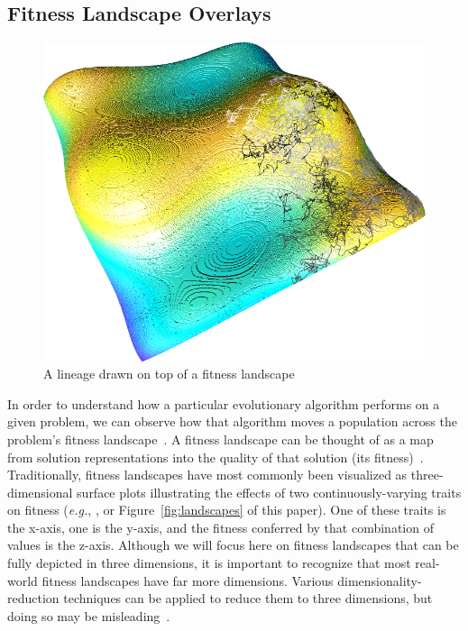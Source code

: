 \documentclass[letterpaper]{article}
\begin{document}

\subsection{Fitness Landscape Overlays}

\begin{figure}
    \centering
    \includegraphics{figs/colored.png}
    \caption{\small A lineage drawn on top of a fitness landscape}
    \label{fig:linoverlay}
\end{figure}

In order to understand how a particular evolutionary algorithm performs on a given problem, we can observe how that algorithm moves a population across the problem's fitness landscape~\citep{kauffman_towards_1987}. A fitness landscape can be thought of as a map from solution representations into the quality of that solution (its fitness)~\citep{wright_roles_1932}.  Traditionally, fitness landscapes have most commonly been visualized as three-dimensional surface plots illustrating the effects of two continuously-varying traits on fitness (\textit{e.g.}, \citealp{li_benchmark_2013}, or Figure~\ref{fig:landscapes} of this paper). One of these traits is the x-axis, one is the y-axis, and the fitness conferred by that combination of values is the z-axis. Although we will focus here on fitness landscapes that can be fully depicted in three dimensions, it is important to recognize that most real-world fitness landscapes have far more dimensions. Various dimensionality-reduction techniques can be applied to reduce them to three dimensions, but doing so may be misleading~\citep{pigliucci_high-dimensional_2010}.
\end{document}
